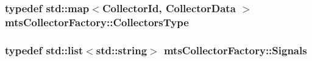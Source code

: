\hypertarget{classmts_collector_factory_ae977f45bdbb0d62035689490d5bf54ee}{
\subsubsection[{Collectors\-Type}]{\setlength{\rightskip}{0pt plus 5cm}typedef std\-::map$<${\bf Collector\-Id}, {\bf Collector\-Data} $>$ {\bf mts\-Collector\-Factory\-::\-Collectors\-Type}\hspace{0.3cm}{\ttfamily [protected]}}}\label{classmts_collector_factory_ae977f45bdbb0d62035689490d5bf54ee}
\hypertarget{classmts_collector_factory_a62e1c130f6074d6633efd23888e6b33f}{
\subsubsection[{Signals}]{\setlength{\rightskip}{0pt plus 5cm}typedef std\-::list$<$std\-::string$>$ {\bf mts\-Collector\-Factory\-::\-Signals}\hspace{0.3cm}{\ttfamily [protected]}}}\label{classmts_collector_factory_a62e1c130f6074d6633efd23888e6b33f}



